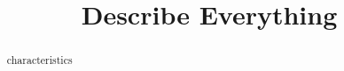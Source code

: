 \documentclass{ximera}
\title{Describe Everything}
\begin{document}
\begin{abstract}
characteristics
\end{abstract}
\maketitle
\end{document}
